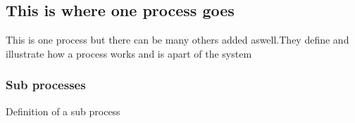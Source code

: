 \subsection{This is where one process goes}
This is one process but there can be many others added aswell.They define and illustrate
how a process works and is apart of the system
\subsubsection{Sub processes}
Definition of a sub process